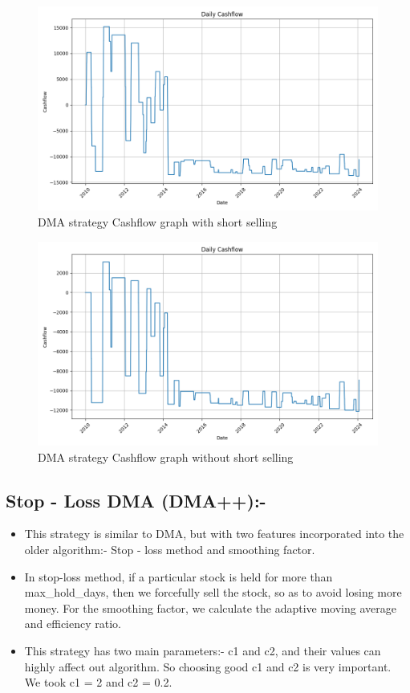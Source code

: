 \documentclass[11pt]{article}
\begin{document}
\begin{figure}[H]
  \centering
  \includegraphics[width=1\textwidth]{DMA_with_short.png}
  \caption{DMA strategy Cashflow graph with short selling}
\end{figure}

\begin{figure}[H]
  \centering
  \includegraphics[width=1\textwidth]{DMA_without_short.png}
  \caption{DMA strategy Cashflow graph without short selling}
\end{figure}

\subsection{Stop - Loss DMA (DMA++):-}
\begin{itemize}
    \item This strategy is similar to DMA, but with two features incorporated into the older algorithm:- Stop - loss method and smoothing factor.
    \item In stop-loss method, if a particular stock is held for more than max\_hold\_days, then we forcefully sell the stock, so as to avoid losing more money. For the smoothing factor, we calculate the adaptive moving average and efficiency ratio.
    \item This strategy has two main parameters:- c1 and c2, and their values can highly affect out algorithm. So choosing good c1 and c2 is very important. We took c1 = 2 and c2 = 0.2.
\end{itemize}
\end{document}

